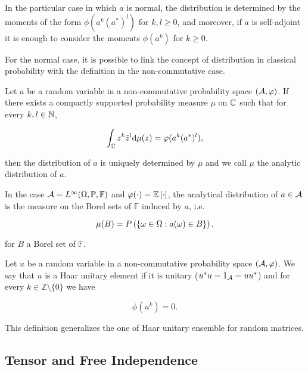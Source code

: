     In the particular case in which $a$ is normal, the distribution is determined by the moments of the form $\phi(a^k(a^*)^l)$ for $k,l \ge 0$, and moreover, if $a$ is self-adjoint it is enough to consider the moments $\phi(a^k)$ for $k\ge 0$. 
    
    For the normal case, it is possible to link the concept of distribution in classical probability with the definition in the non-commutative case.

    \begin{definition}
        Let $a$ be a random variable in a non-commutative probability space $(\A,\phi)$. If there exists a compactly supported probability measure $\mu$ on $\C$ such that for every $k,l\in \N$,

        \begin{equation*}
            \int_\C z^k \bar{z}^l \d \mu(z) = \phi(a^k(a^*)^l),
        \end{equation*}

        then the distribution of $a$ is uniquely determined by $\mu$ and we call $\mu$ the analytic distribution of $a$.
    \end{definition}

    In the case $\A = L^{\infty}(\Omega,\mathbb P, \mathbb F)$ and $\phi(\cdot) = \E{\cdot}$, the analytical distribution of $a \in \A$ is the measure on the Borel sets of $\mathbb F$ induced by $a$, i.e.

    \begin{equation*}
        \mu(B) = \P{ \{ \omega \in \Omega : a(\omega) \in B \} },
    \end{equation*}

    \noindent for $B$ a Borel set of $\mathbb F$.

    \begin{example}
        Let $u$ be a random variable in a non-commutative probability space $(\A,\phi)$. We say that $u$ is a Haar unitary element if it is unitary ($u^*u = 1_\A = uu^*$) and for every $k\in \mathbb Z \setminus \{0\}$ we have

        \begin{equation*}
            \phi(u^k) = 0.
        \end{equation*}
    \end{example}

    This definition generalizes the one of Haar unitary ensemble for random matrices.

\subsection{Tensor and Free Independence}

